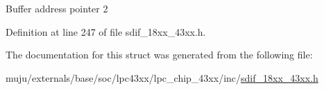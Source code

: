 Buffer address pointer 2 

Definition at line 247 of file sdif\+\_\+18xx\+\_\+43xx.\+h.



The documentation for this struct was generated from the following file\+:\begin{DoxyCompactItemize}
\item 
muju/externals/base/soc/lpc43xx/lpc\+\_\+chip\+\_\+43xx/inc/\hyperlink{sdif__18xx__43xx_8h}{sdif\+\_\+18xx\+\_\+43xx.\+h}\end{DoxyCompactItemize}

